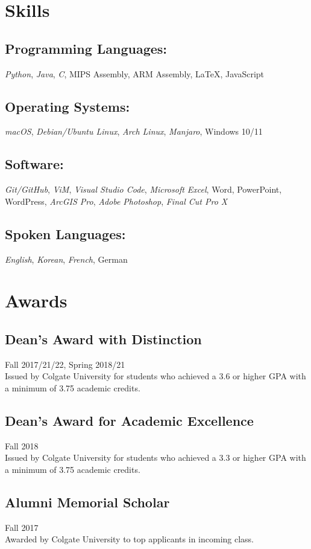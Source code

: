 \documentclass[11pt, letterpaper]{article}
\begin{document}
\section{Skills}
\subsection{Programming Languages: } \emph{ Python}, \emph{Java}, \emph{C}, MIPS Assembly, ARM Assembly, \LaTeX, JavaScript
\subsection{Operating Systems: } \emph{ macOS}, \emph{Debian/Ubuntu Linux}, \emph{Arch Linux}, \emph{Manjaro}, Windows 10/11
\subsection{Software: } \emph{ Git/GitHub}, \emph{ViM}, \emph{Visual Studio Code}, \emph{Microsoft Excel}, Word, PowerPoint,  WordPress, \emph{ArcGIS Pro}, \emph{Adobe Photoshop}, \emph{Final Cut Pro X}
\subsection{Spoken Languages: } \emph{ English}, \emph{Korean}, \emph{French}, German
\section{Awards}
\subsection{Dean's Award with Distinction} \hfill Fall 2017/21/22, Spring 2018/21\\
Issued by Colgate University for students who achieved a 3.6 or higher GPA with a minimum of 3.75 academic credits.

\subsection{Dean's Award for Academic Excellence} \hfill Fall 2018\\
Issued by Colgate University for students who achieved a 3.3 or higher GPA with a minimum of 3.75 academic credits.

\subsection{Alumni Memorial Scholar} \hfill Fall 2017\\
Awarded by Colgate University to top applicants in incoming class.
\end{document}

